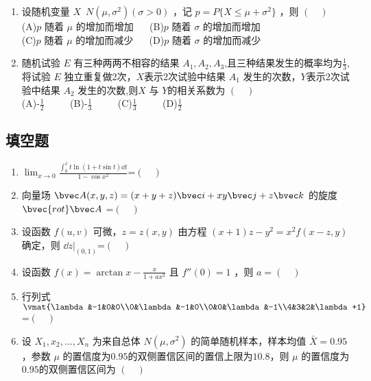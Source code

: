 \begin{enumerate}
\item 设随机变量 $X$~$N(\mu,\sigma^2)(\sigma>0)$  ，记  $p=P\{X \le \mu +\sigma ^2\}$ ，则 $(\quad)$\\
(A)$p$ 随着 $\mu$ 的增加而增加  $\quad$
(B)$p$ 随着 $\sigma$ 的增加而增加\\
(C)$p$ 随着 $\mu$ 的增加而减少 $\quad$
(D)$p$ 随着 $\sigma$ 的增加而减少
\item 随机试验 $E$ 有三种两两不相容的结果 $A_1,A_2,A_3$,且三种结果发生的概率均为$\frac1 3$,将试验 $E$ 独立重复做2次，$X$表示2次试验中结果 $A_1$ 发生的次数，$Y$表示2次试验中结果 $A_2$ 发生的次数,则$X$ 与 $Y$的相关系数为  $(\quad)$\\
(A)-$\frac1 2$ $\qquad$
(B)-$\frac1 3$ $\qquad$
(C)$\frac1 3$ $\qquad$
(D)$\frac1 2$
\end{enumerate}

\subsection{填空题}
\begin{enumerate}
\item $\displaystyle \lim_{{x\to 0 }} \frac{\int_0^x t\ln(1+t\sin t)\dd{t}}{1-\cos x^2} $=$(\quad)$
\item 向量场 $\bvec A(x,y,z)=(x+y+z)\bvec i+xy \bvec j+z \bvec k$ 的旋度 $\bvec {rot} \bvec A$ =$(\quad)$
\item 设函数 $f(u,v)$ 可微，$z=z(x,y)$   由方程 $(x+1)z-y^2=x^2f(x-z,y)$  确定，则 $\dd{z}|_{(0,1)}$=$(\quad)$
\item 设函数 $\displaystyle f(x)=\arctan x-\frac{x}{1+ax^2}$  且 $f''(0)=1$ ，则 $a=(\quad)$
\item 行列式 $\vmat{\lambda&-1&0&0\\0&\lambda&-1&0\\0&0&\lambda&-1\\4&3&2&\lambda+1}$=$(\quad)$
\item 设 $X_1,x_2,\dots,X_n$ 为来自总体 $N(\mu,\sigma^2)$  的简单随机样本，样本均值 $\bar X=0.95$  ，参数 $\mu$ 的置信度为$0.95$的双侧置信区间的置信上限为$10.8$，则 $\mu$ 的置信度为$0.95$的双侧置信区间为 $(\quad)$
\end{enumerate}


